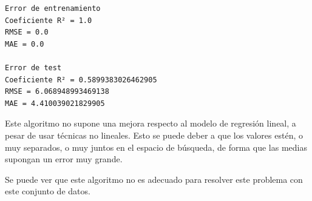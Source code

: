 \documentclass[11pt]{article}
\begin{document}
    \begin{Verbatim}[commandchars=\\\{\}]
Error de entrenamiento
Coeficiente R² = 1.0
RMSE = 0.0
MAE = 0.0

Error de test
Coeficiente R² = 0.5899383026462905
RMSE = 6.068948993469138
MAE = 4.410039021829905
    \end{Verbatim}

    Este algoritmo no supone una mejora respecto al modelo de regresión
lineal, a pesar de usar técnicas no lineales. Esto se puede deber a que
los valores estén, o muy separados, o muy juntos en el espacio de
búsqueda, de forma que las medias supongan un error muy grande.

Se puede ver que este algoritmo no es adecuado para resolver este
problema con este conjunto de datos.


\end{document}
